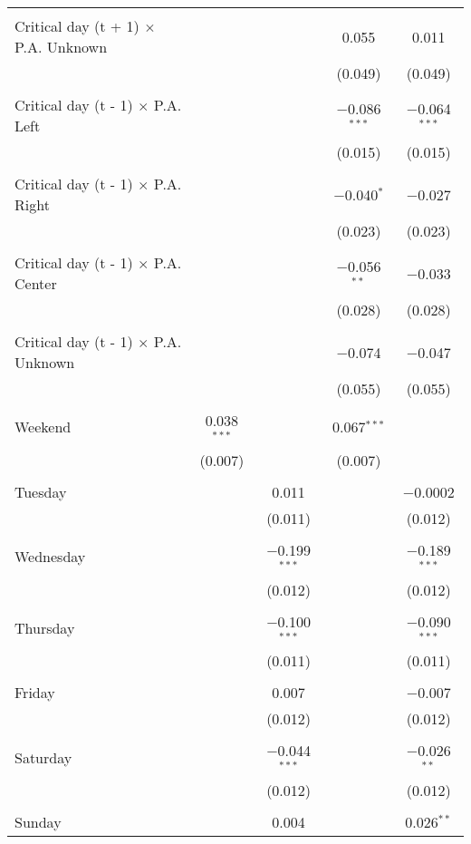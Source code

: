 \documentclass[
]{article}
\begin{document}
\begin{table}[!htbp]
{\begin{tabular}{@{\extracolsep{5pt}}lcccc}
  & & & & \\ 
 Critical day (t + 1) $\times$ P.A. Unknown &  &  & 0.055 & 0.011 \\ 
  &  &  & (0.049) & (0.049) \\ 
  & & & & \\ 
 Critical day (t - 1) $\times$ P.A. Left &  &  & $-$0.086$^{***}$ & $-$0.064$^{***}$ \\ 
  &  &  & (0.015) & (0.015) \\ 
  & & & & \\ 
 Critical day (t - 1) $\times$ P.A. Right &  &  & $-$0.040$^{*}$ & $-$0.027 \\ 
  &  &  & (0.023) & (0.023) \\ 
  & & & & \\ 
 Critical day (t - 1) $\times$ P.A. Center &  &  & $-$0.056$^{**}$ & $-$0.033 \\ 
  &  &  & (0.028) & (0.028) \\ 
  & & & & \\ 
 Critical day (t - 1) $\times$ P.A. Unknown &  &  & $-$0.074 & $-$0.047 \\ 
  &  &  & (0.055) & (0.055) \\ 
  & & & & \\ 
 Weekend & 0.038$^{***}$ &  & 0.067$^{***}$ &  \\ 
  & (0.007) &  & (0.007) &  \\ 
  & & & & \\ 
 Tuesday &  & 0.011 &  & $-$0.0002 \\ 
  &  & (0.011) &  & (0.012) \\ 
  & & & & \\ 
 Wednesday &  & $-$0.199$^{***}$ &  & $-$0.189$^{***}$ \\ 
  &  & (0.012) &  & (0.012) \\ 
  & & & & \\ 
 Thursday &  & $-$0.100$^{***}$ &  & $-$0.090$^{***}$ \\ 
  &  & (0.011) &  & (0.011) \\ 
  & & & & \\ 
 Friday &  & 0.007 &  & $-$0.007 \\ 
  &  & (0.012) &  & (0.012) \\ 
  & & & & \\ 
 Saturday &  & $-$0.044$^{***}$ &  & $-$0.026$^{**}$ \\ 
  &  & (0.012) &  & (0.012) \\ 
  & & & & \\ 
 Sunday &  & 0.004 &  & 0.026$^{**}$ \\ 

\end{tabular}}
\end{table}
\end{document}
